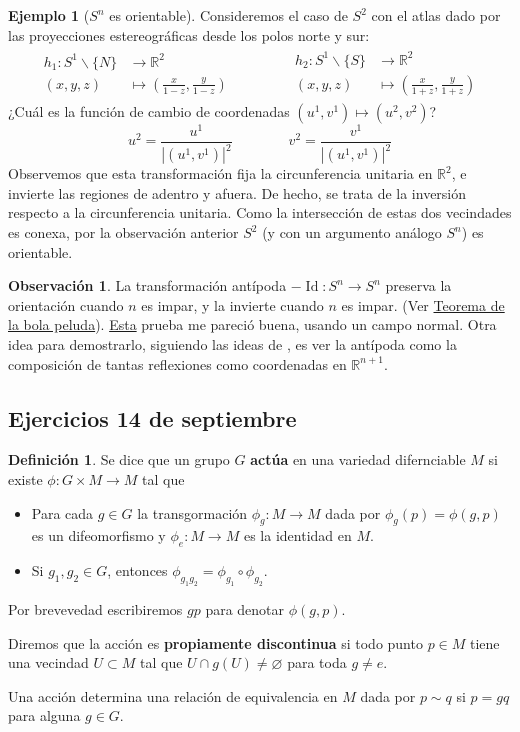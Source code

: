 \documentclass[spanish]{book}
\theoremstyle{definition}
\newtheorem*{defn}{Definición}
\newtheorem*{obs}{Observación}
\newtheorem*{ejem}{Ejemplo}
\newcommand{\R}{\mathbb{R}}
\DeclareMathOperator{\Id}{Id}
\begin{document}
	\begin{ejem}[$S^n$ es orientable]
		Consideremos el caso de $S^2$ con el atlas dado por las proyecciones estereográficas desde los polos norte y sur:
		\begin{align*}
			\begin{aligned}
				h_1:S^1\backslash\{N\}&\to\R^2\\
				(x,y,z)&\mapsto\left(\frac{x}{1-z},\frac{y}{1-z}\right)
			\end{aligned}\qquad\qquad
			\begin{aligned}
				h_2:S^1\backslash\{S\}&\to\R^2\\
				(x,y,z)&\mapsto\left(\frac{x}{1+z},\frac{y}{1+z}\right)
			\end{aligned}
		\end{align*}
		¿Cuál es la función de cambio de coordenadas $(u^1,v^1)\mapsto(u^2,v^2)$?
		\[u^2=\frac{u^1}{|(u^1,v^1)|^2}\qquad\qquad v^2=\frac{v^1}{|(u^1,v^1)|^2}\]
		Observemos que esta transformación fija la circunferencia unitaria en $\R^2$, e invierte las regiones de adentro y afuera. De hecho, se trata de la inversión respecto a la circunferencia unitaria. Como la intersección de estas dos vecindades es conexa, por la observación anterior $S^2$ (y con un argumento análogo $S^n$) es orientable.
	\end{ejem}
	\begin{obs}\label{obs:antipoda-orientacion}
		La transformación antípoda $-\Id:S^n\to S^n$ preserva la orientación cuando $n$ es impar, y la invierte cuando $n$ es impar. (Ver \hyperref[teo:bola-peluda]{Teorema de la bola peluda}). \href{https://math.stackexchange.com/questions/74712/proving-rigorously-a-map-preserves-orientation}{Esta} prueba me pareció buena, usando un campo normal. Otra idea para demostrarlo, siguiendo las ideas de \cite{Hatcher}, es ver la antípoda como la composición de tantas reflexiones como coordenadas en $\R^{n+1}$.
	\end{obs}
	\subsection{Ejercicios 14 de septiembre}
	\begin{defn}
		Se dice que un grupo $G$ \textbf{actúa} en una variedad difernciable $M$ si existe $\phi:G\times M\to M$ tal que
		\begin{itemize}
			\item Para cada $g\in G$ la transgormación $\phi_g:M\to M$ dada por $\phi_g(p)=\phi(g,p)$ es un difeomorfismo y $\phi_e:M\to M$ es la identidad en $M$.
			\item Si $g_1,g_2\in G$, entonces $\phi_{g_1g_2}=\phi_{g_1}\circ\phi_{g_2}$.
		\end{itemize}
		Por brevevedad escribiremos $gp$ para denotar $\phi(g,p)$.
		
		Diremos que la acción es \textbf{propiamente discontinua} si todo punto $p\in M$ tiene una vecindad $U\subset M$ tal que $U\cap g(U)\neq\varnothing$ para toda $g\neq e$.
	\end{defn}
	Una acción determina una relación de equivalencia en $M$ dada por $p\sim q$ si $p=gq$ para alguna $g\in G$.
	
\end{document}
